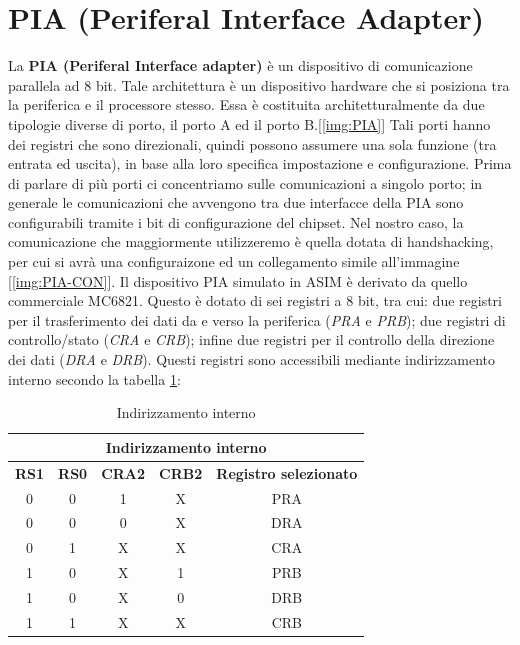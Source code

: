 \section{PIA (Periferal Interface Adapter)}

La \textbf{PIA (Periferal Interface adapter)} è un dispositivo di comunicazione parallela ad 8 bit. Tale architettura è un dispositivo hardware che si posiziona tra la periferica e il processore stesso. Essa è costituita architetturalmente da due tipologie diverse di porto, il porto A ed il porto B.[\ref{img:PIA}]
Tali porti hanno dei registri che sono direzionali, quindi possono assumere una sola funzione (tra entrata ed uscita), in base alla loro specifica impostazione e configurazione.
Prima di parlare di più porti ci concentriamo sulle comunicazioni a singolo porto; in generale le comunicazioni che avvengono tra due interfacce della PIA sono configurabili tramite i bit di configurazione del chipset. Nel nostro caso, la comunicazione che maggiormente utilizzeremo è quella dotata di handshacking, per cui si avrà una configuraizone ed un collegamento simile all'immagine [\ref{img:PIA-CON}].
Il dispositivo PIA simulato in ASIM è derivato da quello commerciale MC6821. Questo è dotato di sei registri a 8 bit, tra cui: due registri per il trasferimento dei dati da e verso la periferica (\textit{PRA} e \textit{PRB}); due registri di controllo/stato (\textit{CRA} e \textit{CRB}); infine due registri per il controllo della direzione dei dati (\textit{DRA} e \textit{DRB}). Questi registri sono accessibili mediante indirizzamento interno secondo la tabella \ref{Tab:reg_ind_1}:

\begin{table} [!h]
    \centering
    \begin{tabular}{|c|c|c|c|c|}
        \hline
        \multicolumn{5}{|c|}{\textbf{Indirizzamento interno}} \\ \hline
        \textbf{RS1} & \textbf{RS0} & \textbf{CRA2} & \textbf{CRB2} & \textbf{Registro selezionato}\\ \hline
        0       &0      &1      &X      &PRA    \\  \hline
        0       &0      &0      &X      &DRA    \\  \hline
        0       &1      &X      &X      &CRA    \\  \hline
        1       &0      &X      &1      &PRB    \\  \hline
        1       &0      &X      &0      &DRB    \\  \hline
        1       &1      &X      &X      &CRB    \\  \hline
    \end{tabular}
    \caption{Indirizzamento interno}
    \label{Tab:reg_ind_1}
\end{table}


